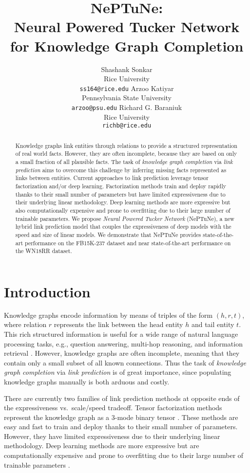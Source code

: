 \documentclass[11pt]{article}
\title{\bf {\LARGE NePTuNe:} \\ Neural Powered Tucker Network \\ for Knowledge Graph Completion}
\author{Shashank Sonkar \\
  Rice University \\
  {\tt ss164@rice.edu}
  \And
  Arzoo Katiyar \\
  Pennsylvania State University \\
  {\tt arzoo@psu.edu} 
  \And
  Richard G. Baraniuk \\
  Rice University \\
  {\tt richb@rice.edu}
}
\date{}
\begin{document}
\maketitle
\begin{abstract}
    Knowledge graphs link entities through relations to provide a structured representation of real world facts. However, they are often incomplete, because they are based on only a small fraction of all plausible facts. The task of {\em knowledge graph completion} via {\em link prediction} aims to overcome this challenge by inferring missing facts represented as links between entities. Current approaches to link prediction leverage tensor factorization and/or deep learning. 
    Factorization methods train and deploy rapidly thanks to their small number of parameters but have limited expressiveness due to their underlying linear methodology.
    Deep learning methods are more expressive but also computationally expensive and prone to overfitting due to their large number of trainable parameters. 
    We propose \textit{Neural Powered Tucker Network} (NePTuNe), a new hybrid link prediction model that couples the expressiveness of deep models with the speed and size of linear models. 
    We demonstrate that NePTuNe provides state-of-the-art performance on the FB15K-237 dataset and near state-of-the-art performance on the WN18RR dataset.
\end{abstract}
\vspace{0.1cm}

\section{Introduction}
Knowledge graphs encode information by means of triples of the form $(h, r, t)$, where relation $r$ represents the link between the head entity $h$ and tail entity $t$. This rich structured information is useful for a wide range of natural language processing tasks, e.g., question answering, multi-hop reasoning, and information retrieval \cite{hao2017end,zhang2018variational,dietz2018utilizing}. However, knowledge graphs are often incomplete, meaning that they contain only a small subset of all known connections. Thus the task of {\em knowledge graph completion} via {\em link prediction} is of great importance, since populating knowledge graphs manually is both arduous and costly.

There are currently two families of link prediction methods at opposite ends of the expressiveness vs.\ scale/speed tradeoff.
Tensor factorization methods represent the knowledge graph as a 3-mode binary tensor \cite{nickel2011three,yang2014embedding,trouillon2017knowledge,balavzevic2019tucker}. 
These methods are easy and fast to train and deploy thanks to their small number of parameters.
However, they have limited expressiveness due to their underlying linear methodology.  
Deep learning methods are more expressive but are computationally expensive and prone to overfitting due to their large number of trainable parameters  \cite{nickel2011three,socher2013reasoning}. 
\end{document}
